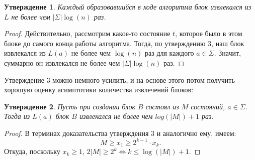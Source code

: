 \documentclass{article}
\newtheorem{statement}{Утверждение}
\begin{document}
\begin{statement}
    Каждый образовавшийся в ходе алгоритма блок извлекался из $L$ не более чем $|\Sigma| \log(n)$ раз.
\end{statement}
\begin{proof}
    Действительно, рассмотрим какое-то состояние $t$, которое было в этом блоке до самого конца работы алгоритма. Тогда, по утверждению 3, наш блок извлекался из $L(a)$ не более чем $\log(n)$ раз для каждого $a \in \Sigma$. Значит, суммарно он извлекался не более чем $|\Sigma| \log(n)$ раз.
\end{proof}

Утверждение 3 можно немного усилить, и на основе этого потом получить хорошую оценку асимптотики количества извлечений блоков:
\begin{statement}
    Пусть при создании блок $B$ состоял из $M$ состояний, $a \in \Sigma$. Тогда из $L(a)$ блок $B$ извлекался не более чем $log(|M|) + 1$ раз.
\end{statement}
\begin{proof}
    В терминах доказательства утверждения 3 и аналогично ему, имеем:
    \[M \ge x_1 \ge 2^{k-1} \cdot x_k.\]
    Откуда, поскольку $x_k \ge 1$, $2 |M| \ge 2^k \Leftrightarrow k \le \log(|M|) + 1$. 
\end{proof}
\end{document}
